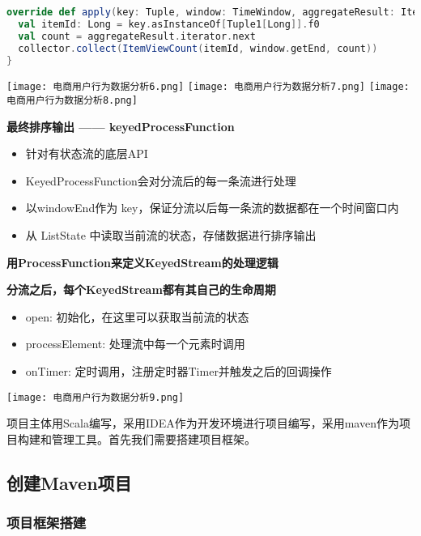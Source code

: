 \documentclass[oneside]{ctexbook}
\begin{document}
\begin{lstlisting}[language=scala]
override def apply(key: Tuple, window: TimeWindow, aggregateResult: Iterable[Long], collector: Collector[ItemViewCount]) : Unit = {
  val itemId: Long = key.asInstanceOf[Tuple1[Long]].f0
  val count = aggregateResult.iterator.next
  collector.collect(ItemViewCount(itemId, window.getEnd, count))
}
\end{lstlisting}

\noindent \texttt{[image: 电商用户行为数据分析6.png]}
\noindent \texttt{[image: 电商用户行为数据分析7.png]}
\noindent \texttt{[image: 电商用户行为数据分析8.png]}

\textbf{最终排序输出 —— keyedProcessFunction}
\begin{itemize}
\item 针对有状态流的底层API
\item KeyedProcessFunction会对分流后的每一条流进行处理
\item 以windowEnd作为 key，保证分流以后每一条流的数据都在一个时间窗口内
\item 从 ListState 中读取当前流的状态，存储数据进行排序输出
\end{itemize}

\textbf{用ProcessFunction来定义KeyedStream的处理逻辑}

\textbf{分流之后，每个KeyedStream都有其自己的生命周期}
\begin{itemize}
\item open: 初始化，在这里可以获取当前流的状态
\item processElement: 处理流中每一个元素时调用
\item onTimer: 定时调用，注册定时器Timer并触发之后的回调操作
\end{itemize}

\noindent \texttt{[image: 电商用户行为数据分析9.png]}

项目主体用Scala编写，采用IDEA作为开发环境进行项目编写，采用maven作为项目构建和管理工具。首先我们需要搭建项目框架。

\subsection{创建Maven项目}

\subsubsection{项目框架搭建}
\end{document}
